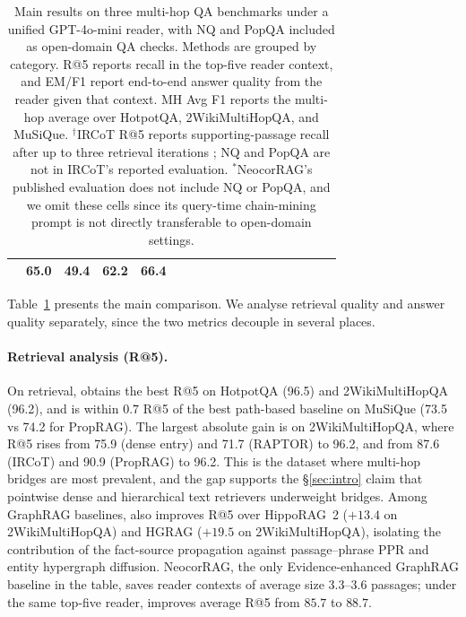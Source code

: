 \begin{table}[t]
{\begin{tabular}{llccc ccc ccc ccc ccc c}
                 & \textbf{65.0} & \textbf{49.4} & \textbf{62.2} & \textbf{66.4} \\
\bottomrule
\end{tabular}
\vspace{1pt}
}
\caption{Main results on three multi-hop QA benchmarks under a unified
GPT-4o-mini reader, with NQ and PopQA included as open-domain QA checks.
Methods are grouped by category. R@5 reports recall in the top-five
reader context, and EM/F1 report end-to-end answer quality from the
reader given that context. MH Avg F1 reports the multi-hop average over
HotpotQA, 2WikiMultiHopQA, and MuSiQue. $^{\dagger}$IRCoT R@5 reports
supporting-passage recall after up to three retrieval iterations
\citep{trivedi2023ircot}; NQ and PopQA are not in IRCoT's reported
evaluation. $^{\ast}$NeocorRAG's published evaluation does not include
NQ or PopQA, and we omit these cells since its query-time chain-mining
prompt is not directly transferable to open-domain settings.}
\label{tab:main-results}
\end{table}

Table~\ref{tab:main-results} presents the main comparison. We
analyse retrieval quality and answer quality separately, since the
two metrics decouple in several places.

\paragraph{Retrieval analysis (R@5).}
On retrieval, \methodname{} obtains the best R@5 on HotpotQA
(96.5) and 2WikiMultiHopQA (96.2), and is within $0.7$ R@5 of the
best path-based baseline on MuSiQue (73.5 vs 74.2 for PropRAG).
The largest absolute gain is on 2WikiMultiHopQA, where R@5 rises
from 75.9 (dense entry) and 71.7 (RAPTOR) to 96.2, and from 87.6
(IRCoT) and 90.9 (PropRAG) to 96.2. This is the dataset where
multi-hop bridges are most prevalent, and the gap supports the
\S\ref{sec:intro} claim that pointwise dense and hierarchical
text retrievers underweight bridges. Among GraphRAG baselines,
\methodname{} also improves R@5 over HippoRAG~2 ($+13.4$ on
2WikiMultiHopQA) and HGRAG ($+19.5$ on 2WikiMultiHopQA), isolating
the contribution of the fact-source propagation against
passage--phrase PPR and entity hypergraph diffusion. NeocorRAG, the
only Evidence-enhanced GraphRAG baseline in the table, saves
reader contexts of average size $3.3$--$3.6$ passages; under the
same top-five reader, \methodname{} improves average R@5 from
$85.7$ to $88.7$.

